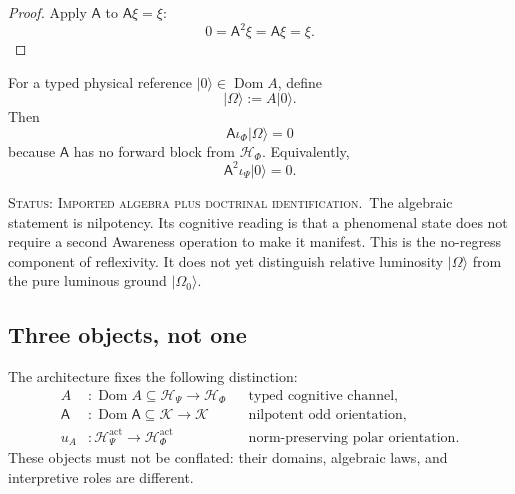 \documentclass[11pt,reqno]{scrartcl}
\newcommand{\scrK}{\mathscr K}
\newcommand{\scrHP}{\mathscr H_{\Psi}}
\newcommand{\scrHF}{\mathscr H_{\Phi}}
\newcommand{\Aodd}{\mathsf A}
\newcommand{\iP}{\iota_{\Psi}}
\newcommand{\iF}{\iota_{\Phi}}
\newcommand{\ket}[1]{\lvert #1\rangle}
\DeclareMathOperator{\Dom}{Dom}
\newcommand{\statuslabel}[1]{\par\smallskip\noindent\textsc{Status: #1.}\ }
\theoremstyle{plain}
\theoremstyle{definition}
\theoremstyle{remark}
\begin{document}
\begin{proof}
Apply \(\Aodd\) to \(\Aodd\xi=\xi\):
\begin{equation}
  0=\Aodd^2\xi=\Aodd\xi=\xi.
\end{equation}
\end{proof}

For a typed physical reference \(\ket0\in\Dom A\), define
\begin{equation}
  \ket\Omega:=A\ket0.
  \label{eq:relative-luminosity}
\end{equation}
Then
\begin{equation}
  \Aodd\iF\ket\Omega=0
  \label{eq:odd-terminal}
\end{equation}
because \(\Aodd\) has no forward block from \(\scrHF\).  Equivalently,
\begin{equation}
  \Aodd^2\iP\ket0=0.
  \label{eq:iterated-awareness}
\end{equation}

\statuslabel{Imported algebra plus doctrinal identification}The algebraic
statement is nilpotency.  Its cognitive reading is that a phenomenal state
does not require a second Awareness operation to make it manifest.  This is
the no-regress component of reflexivity.  It does not yet distinguish
relative luminosity \(\ket\Omega\) from the pure luminous ground
\(\ket{\Omega_0}\).

\subsection{Three objects, not one}

The architecture fixes the following distinction:
\begin{equation}
  \boxed{
  \begin{aligned}
  A&:\Dom A\subseteq\scrHP\to\scrHF
  &&\text{typed cognitive channel},\\
  \Aodd&:\Dom\Aodd\subseteq\scrK\to\scrK
  &&\text{nilpotent odd orientation},\\
  u_A&:\scrHP^{\mathrm{act}}\to\scrHF^{\mathrm{act}}
  &&\text{norm-preserving polar orientation}.
  \end{aligned}}
  \label{eq:three-object-summary}
\end{equation}
These objects must not be conflated: their domains, algebraic laws, and
interpretive roles are different.
\end{document}

